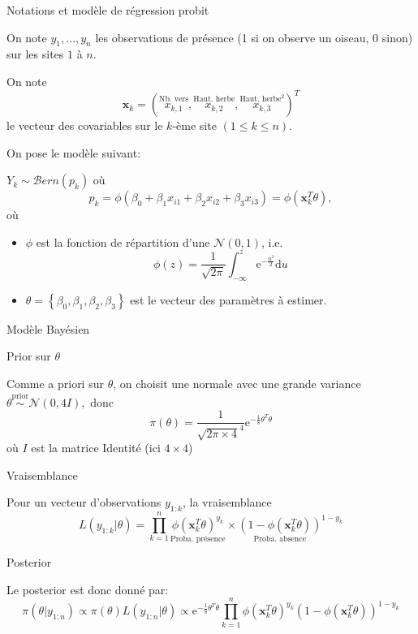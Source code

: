 \documentclass[9pt,ignorenonframetext,]{beamer}
\providecommand{\tightlist}{%
  \setlength{\itemsep}{0pt}\setlength{\parskip}{0pt}}
\begin{document}
\begin{frame}{Notations et modèle de régression probit}
\protect\hypertarget{notations-et-moduxe8le-de-ruxe9gression-probit}{}

On note \(y_1, \dots, y_n\) les observations de présence (1 si on
observe un oiseau, 0 sinon) sur les sites \(1\) à \(n\).

On note
\[\mathbf{x}_k = (\overset{\text{Nb. vers}}{x_{k,1}}, \overset{\text{Haut. herbe}}{x_{k,2}}, \overset{\text{Haut. herbe}^2}{x_{k,3}})^T\]
le vecteur des covariables sur le \(k\)-ème site
\((1\leq k \leq n)\).\pause

On pose le modèle suivant:

\(Y_k \sim \mathcal{B}ern(p_k)\) où
\[p_k = \phi(\beta_0 + \beta_1 x_{i1} + \beta_2x_{i2} + \beta_3 x_{i3}) = \phi(\mathbf{x}_k^T\theta),\]
où

\begin{itemize}
\tightlist
\item
  \(\phi\) est la fonction de répartition d'une \(\mathcal{N}(0, 1)\),
  i.e.
  \[\phi(z) = \frac{1}{\sqrt{2\pi}}\int_{-\infty}^z \text{e}^{-\frac{u^2}{2}}\text{d}u\]
\item
  \(\theta = \left\lbrace \beta_0, \beta_1, \beta_2, \beta_3\right\rbrace\)
  est le vecteur des paramètres à estimer.
\end{itemize}

\end{frame}

\begin{frame}{Modèle Bayésien}
\protect\hypertarget{moduxe8le-bayuxe9sien}{}

\begin{block}{Prior sur \(\theta\)}

Comme a priori sur \(\theta\), on choisit une normale avec une grande
variance\(\theta \overset{\text{prior}}{\sim} \mathcal{N}(0, 4 I),\)
donc
\[\pi(\theta) = \frac{1}{\sqrt{2\pi \times 4}^4} \text{e}^{-\frac{1}{8}\theta^T\theta}\]
où \(I\) est la matrice Identité (ici \(4 \times 4\)) \pause

\end{block}

\begin{block}{Vraisemblance}

Pour un vecteur d'observations \(y_{1:k}\), la vraisemblance
\[L(y_{1:k}\vert \theta) = \prod_{k = 1}^n \underset{\text{Proba. présence}}{\phi(\mathbf{x}_k^T\theta)^{y_k}}\times \underset{\text{Proba. absence}}{(1 - \phi(\mathbf{x}_k^T\theta))}^{1 - y_k}\]
\pause

\end{block}

\begin{block}{Posterior}

Le posterior est donc donné par:
\[\pi(\theta \vert y_{1:n}) \propto \pi(\theta) L(y_{1:n}\vert \theta) \propto \text{e}^{-\frac{1}{8}\theta^T\theta} \prod_{k = 1}^n \phi(\mathbf{x}_k^T\theta)^{y_k} (1 - \phi(\mathbf{x}_k^T\theta))^{1 - y_k}\]

\end{block}

\end{frame}
\end{document}
